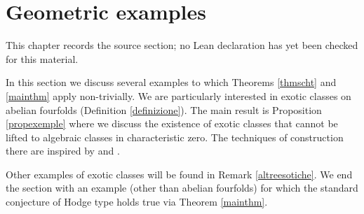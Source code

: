 \chapter{Geometric examples}
\label{standard-conjectures-abelian-fourfolds-chapter-14}

\begin{remark}
\label{standard-conjectures-abelian-fourfolds-chapter-14-source}
This chapter records the source section; no Lean declaration has yet been checked for this material.
\notready
\end{remark}

\label{geometricexamples}
In this section we discuss several examples to which Theorems \ref{thmscht} and \ref{mainthm} apply non-trivially. We are  particularly interested in exotic classes on abelian fourfolds (Definition \ref{definizione}). The main result is Proposition \ref{propexemple} where we discuss the existence of exotic classes that cannot be lifted to algebraic classes in characteristic zero. The techniques of construction there are inspired by \cite{LeOo} and
 \cite{Zah}.

  Other examples of exotic classes will be found  in Remark \ref{altreesotiche}. We end the section with an example (other than abelian fourfolds) for which the standard conjecture of Hodge type holds true via Theorem \ref{mainthm}.


